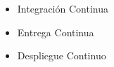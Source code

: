 \documentclass[preprint,12pt]{elsarticle}
\begin{document}
\begin{itemize}

\item Integración Continua


\item Entrega Continua


\item Despliegue Continuo

 
\end{itemize}
\end{document}
